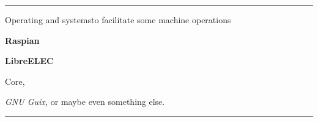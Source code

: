 
\hrule
\vskip 1in
\centerline{Operating and systemsto facilitate some machine operations}
\vskip17pt
\centerline{\bf Raspian}
\vskip         8.5pt
\centerline{\bf LibreELEC}
{\ttTiny Core,} %

{\it GNU Guix,}
or maybe even something else.
\hrule
\vfill\eject
